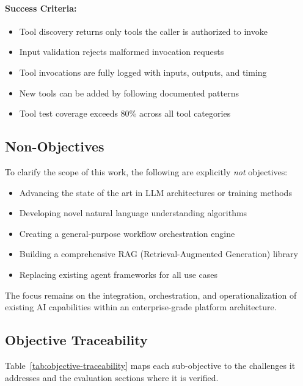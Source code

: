 \documentclass[a4paper,twoside]{sapthesis}
\begin{document}
\paragraph{Success Criteria:}
\begin{itemize}
    \item Tool discovery returns only tools the caller is authorized to invoke
    \item Input validation rejects malformed invocation requests
    \item Tool invocations are fully logged with inputs, outputs, and timing
    \item New tools can be added by following documented patterns
    \item Tool test coverage exceeds 80\% across all tool categories
\end{itemize}

\subsection{Non-Objectives}

To clarify the scope of this work, the following are explicitly \emph{not} objectives:

\begin{itemize}
    \item Advancing the state of the art in LLM architectures or training methods
    \item Developing novel natural language understanding algorithms
    \item Creating a general-purpose workflow orchestration engine
    \item Building a comprehensive RAG (Retrieval-Augmented Generation) library
    \item Replacing existing agent frameworks for all use cases
\end{itemize}

The focus remains on the integration, orchestration, and operationalization of existing AI capabilities within an enterprise-grade platform architecture.

\subsection{Objective Traceability}

Table~\ref{tab:objective-traceability} maps each sub-objective to the challenges it addresses and the evaluation sections where it is verified.
\end{document}
